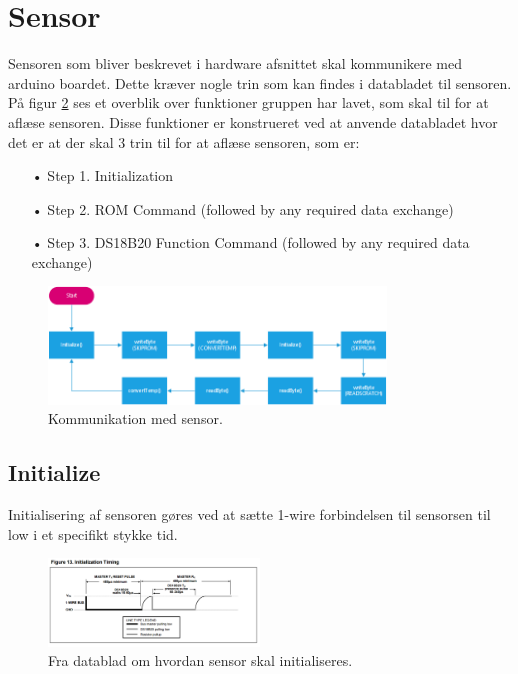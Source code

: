 \section{Sensor}
Sensoren som bliver beskrevet i hardware afsnittet skal kommunikere med arduino boardet. Dette kræver nogle trin som kan findes i databladet til sensoren. På figur \ref{sensor_kom} ses et overblik over funktioner gruppen har lavet, som skal til for at aflæse sensoren. Disse funktioner er konstrueret ved at anvende databladet hvor det er at der skal 3 trin til for at aflæse sensoren, som er:

\begin{enumerate}
   \item[•]Step 1. Initialization
   \item[•]Step 2. ROM Command (followed by any required data exchange)
   \item[•]Step 3. DS18B20 Function Command (followed by any required data exchange)
\end{enumerate}

\begin{figure}[h!]
  \centering
  \includegraphics[width=0.8\textwidth]{figures/ds18b20_sensor_communication.png}
  \caption{Kommunikation med sensor.}
  \label{sensor_kom}
\end{figure}

\newpage
\subsection{Initialize}
Initialisering af sensoren gøres ved at sætte 1-wire forbindelsen til sensorsen til low i et specifikt stykke tid.

\begin{figure}[h!]
  \centering
  \includegraphics[width=0.5\textwidth]{figures/Initialization_timing.png}
  \caption{Fra datablad om hvordan sensor skal initialiseres.}
  \label{sensor_kom}
\end{figure}

